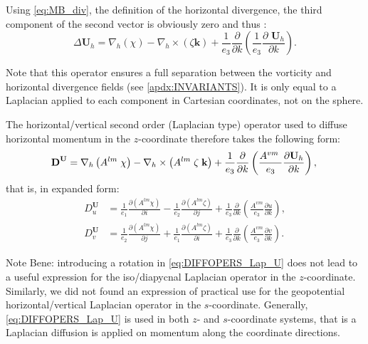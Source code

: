 \documentclass[../main/NEMO_manual]{subfiles}
\begin{document}
Using \autoref{eq:MB_div}, the definition of the horizontal divergence,
the third component of the second vector is obviously zero and thus :
\[
  \Delta {\textbf{U}}_h = \nabla _h \left( \chi \right) - \nabla _h \times \left( \zeta \textbf{k} \right) + \frac {1}{e_3 } \frac {\partial }{\partial k} \left( {\frac {1}{e_3 } \frac{\partial {\textbf{ U}}_h }{\partial k}} \right) .
\]

Note that this operator ensures a full separation between
the vorticity and horizontal divergence fields (see \autoref{apdx:INVARIANTS}).
It is only equal to a Laplacian applied to each component in Cartesian coordinates, not on the sphere.

The horizontal/vertical second order (Laplacian type) operator used to diffuse horizontal momentum in
the $z$-coordinate therefore takes the following form:
\begin{equation}
  \label{eq:DIFFOPERS_Lap_U}
  {
    \textbf{D}}^{\textbf{U}} =
  \nabla _h \left( {A^{lm}\;\chi } \right)
  - \nabla _h \times \left( {A^{lm}\;\zeta \;{\textbf{k}}} \right)
  + \frac{1}{e_3 }\frac{\partial }{\partial k}\left( {\frac{A^{vm}\;}{e_3 }
      \frac{\partial {\mathrm {\mathbf U}}_h }{\partial k}} \right) , \\
\end{equation}
that is, in expanded form:
\begin{align*}
  D^{\textbf{U}}_u
  & = \frac{1}{e_1} \frac{\partial \left( {A^{lm}\chi   } \right)}{\partial i}
    -\frac{1}{e_2} \frac{\partial \left( {A^{lm}\zeta } \right)}{\partial j}
    +\frac{1}{e_3} \frac{\partial }{\partial k} \left( \frac{A^{vm}}{e_3} \frac{\partial u}{\partial k} \right)   ,   \\
  D^{\textbf{U}}_v
  & = \frac{1}{e_2 }\frac{\partial \left( {A^{lm}\chi   } \right)}{\partial j}
    +\frac{1}{e_1 }\frac{\partial \left( {A^{lm}\zeta } \right)}{\partial i}
    +\frac{1}{e_3} \frac{\partial }{\partial k} \left( \frac{A^{vm}}{e_3} \frac{\partial v}{\partial k} \right) .
\end{align*}

Note Bene: introducing a rotation in \autoref{eq:DIFFOPERS_Lap_U} does not lead to
a useful expression for the iso/diapycnal Laplacian operator in the $z$-coordinate.
Similarly, we did not found an expression of practical use for
the geopotential horizontal/vertical Laplacian operator in the $s$-coordinate.
Generally, \autoref{eq:DIFFOPERS_Lap_U} is used in both $z$- and $s$-coordinate systems,
that is a Laplacian diffusion is applied on momentum along the coordinate directions.

\subinc{}
\end{document}
